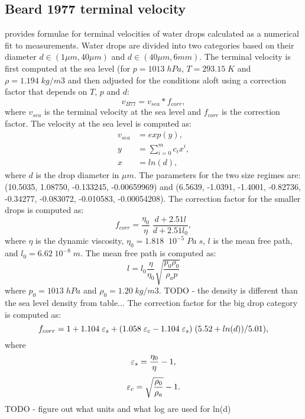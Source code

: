 \documentclass{report}
\begin{document}
\subsection{Beard 1977 terminal velocity}

\citet{Beard1977} provides formulae for terminal velocities of water drops calculated as a numerical fit  to measurements. Water drops are divided into two categories based on their diameter $ d \in (1 \mu m,  40 \mu m)$ and $d \in (40 \mu m, 6mm)$. The terminal velocity is first computed at the sea level (for $p = 1013 \; hPa$, $T = 293.15 \; K$ and $\rho = 1.194 \; kg/m3$ and then adjusted for the conditions aloft using a correction factor that depends on $T$, $p$ and $d$:
\begin{equation}
    v_{B77} = v_{sea} * f_{corr},
\end{equation}
where $v_{sea}$ is the terminal velocity at the sea level and $f_{corr}$ is the correction factor.
The velocity at the sea level is computed as:
\begin{equation}
\begin{aligned}
    v_{sea} &= exp(y),\\
    y &= \sum_{i=0}^{m} c_i x^i, \\
    x &= ln(d),
\end{aligned}
\end{equation}
where $d$ is the drop diameter in $\mu m$. The parameters for the two size regimes are: (10.5035,  1.08750, -0.133245, -0.00659969) and (6.5639, -1.0391, -1.4001, -0.82736, -0.34277, -0.083072, -0.010583, -0.00054208). The correction factor for the smaller drops is computed as:
\begin{equation}
    f_{corr} = \frac{\eta_0}{\eta} \; \frac{d + 2.51 l}{d + 2.51 l_0},
\end{equation}
where $\eta$ is the dynamic viscosity,
$\eta_0 = 1.818 \;\; 10^{-5} \; Pa \; s$,
$l$ is the mean free path, and
$l_0 = 6.62 \; 10^{-8} \; m$.
The mean free path is computed as:
\begin{equation}
l = l_0 \frac{\eta}{\eta_0}  \sqrt{\frac{p_{0} \rho_{0}}{\rho_a p}}
\end{equation}
where $p_0 = 1013 \; hPa$ and $\rho_0 = 1.20 \; kg/m3$. {\color{red} TODO - the density is different than the sea level density from table...} The correction factor for the big drop category is computed as:
\begin{equation}
f_{corr} = 1 + 1.104 \; \varepsilon_s + ( 1.058 \; \varepsilon_c - 1.104 \; \varepsilon_s) \; (5.52 + ln(d))/5.01),
\end{equation}
where
\begin{equation}
  \varepsilon_s = \frac{\eta_0}{\eta} - 1,
\end{equation}
\begin{equation}
  \varepsilon_c = \sqrt{\frac{\rho_0}{\rho_a}} - 1.
\end{equation}
{\color{red} TODO - figure out what units and what log are used for ln(d)}
\end{document}
